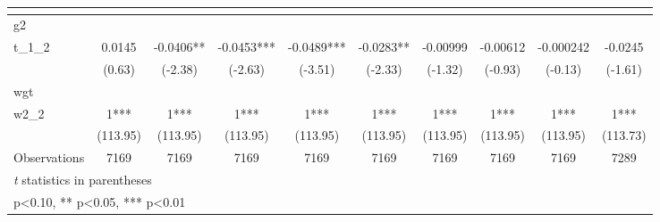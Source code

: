 \begin{table}[htbp]\centering
\def\sym#1{\ifmmode^{#1}\else\(^{#1}\)\fi}
\caption{ \label{tab1}}
\begin{tabular}{l*{9}{c}}
\toprule
                    &\multicolumn{1}{c}{}&\multicolumn{1}{c}{}&\multicolumn{1}{c}{}&\multicolumn{1}{c}{}&\multicolumn{1}{c}{}&\multicolumn{1}{c}{}&\multicolumn{1}{c}{}&\multicolumn{1}{c}{}&\multicolumn{1}{c}{}\\
\midrule
g2                  &               &               &               &               &               &               &               &               &               \\
t\_1\_2               &      0.0145   &     -0.0406** &     -0.0453***&     -0.0489***&     -0.0283** &    -0.00999   &    -0.00612   &   -0.000242   &     -0.0245   \\
                    &      (0.63)   &     (-2.38)   &     (-2.63)   &     (-3.51)   &     (-2.33)   &     (-1.32)   &     (-0.93)   &     (-0.13)   &     (-1.61)   \\
\midrule
wgt                 &               &               &               &               &               &               &               &               &               \\
w2\_2                &           1***&           1***&           1***&           1***&           1***&           1***&           1***&           1***&           1***\\
                    &    (113.95)   &    (113.95)   &    (113.95)   &    (113.95)   &    (113.95)   &    (113.95)   &    (113.95)   &    (113.95)   &    (113.73)   \\
\midrule
Observations        &        7169   &        7169   &        7169   &        7169   &        7169   &        7169   &        7169   &        7169   &        7289   \\
\bottomrule
\multicolumn{10}{l}{\footnotesize \textit{t} statistics in parentheses}\\
\multicolumn{10}{l}{\footnotesize * p<0.10, ** p<0.05, *** p<0.01}\\
\end{tabular}
\end{table}
